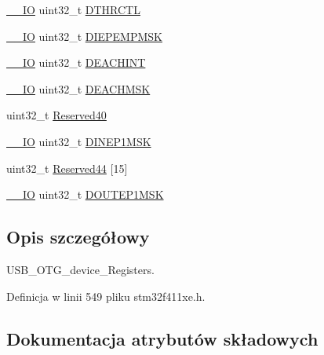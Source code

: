 \begin{DoxyCompactItemize}
\item 
\hyperlink{core__sc300_8h_aec43007d9998a0a0e01faede4133d6be}{\+\_\+\+\_\+\+IO} uint32\+\_\+t \hyperlink{struct_u_s_b___o_t_g___device_type_def_af0a7a07413a095432031eddc900031cd}{D\+T\+H\+R\+C\+TL}
\item 
\hyperlink{core__sc300_8h_aec43007d9998a0a0e01faede4133d6be}{\+\_\+\+\_\+\+IO} uint32\+\_\+t \hyperlink{struct_u_s_b___o_t_g___device_type_def_a6dca86482073d69a44c8e0e3a5efe068}{D\+I\+E\+P\+E\+M\+P\+M\+SK}
\item 
\hyperlink{core__sc300_8h_aec43007d9998a0a0e01faede4133d6be}{\+\_\+\+\_\+\+IO} uint32\+\_\+t \hyperlink{struct_u_s_b___o_t_g___device_type_def_a881208a5819f6a8bfb1f16a2d7cd05a1}{D\+E\+A\+C\+H\+I\+NT}
\item 
\hyperlink{core__sc300_8h_aec43007d9998a0a0e01faede4133d6be}{\+\_\+\+\_\+\+IO} uint32\+\_\+t \hyperlink{struct_u_s_b___o_t_g___device_type_def_ab10e5be5517065dccac3d098cc1b9894}{D\+E\+A\+C\+H\+M\+SK}
\item 
uint32\+\_\+t \hyperlink{struct_u_s_b___o_t_g___device_type_def_a4356045c881b1f037c3016473e580679}{Reserved40}
\item 
\hyperlink{core__sc300_8h_aec43007d9998a0a0e01faede4133d6be}{\+\_\+\+\_\+\+IO} uint32\+\_\+t \hyperlink{struct_u_s_b___o_t_g___device_type_def_a6dccbd3d18fe0e4e552aefc9f6f469fa}{D\+I\+N\+E\+P1\+M\+SK}
\item 
uint32\+\_\+t \hyperlink{struct_u_s_b___o_t_g___device_type_def_a6bb6a88a8d92f9cb65d104f40934844b}{Reserved44} \mbox{[}15\mbox{]}
\item 
\hyperlink{core__sc300_8h_aec43007d9998a0a0e01faede4133d6be}{\+\_\+\+\_\+\+IO} uint32\+\_\+t \hyperlink{struct_u_s_b___o_t_g___device_type_def_aabe0c08efd8c18aa1f85e4a38a3d2469}{D\+O\+U\+T\+E\+P1\+M\+SK}
\end{DoxyCompactItemize}


\subsection{Opis szczegółowy}
U\+S\+B\+\_\+\+O\+T\+G\+\_\+device\+\_\+\+Registers. 

Definicja w linii 549 pliku stm32f411xe.\+h.



\subsection{Dokumentacja atrybutów składowych}
\mbox{\label{struct_u_s_b___o_t_g___device_type_def_a5d28aaa3ea2e4e2246f9ba7025c6a8e7}} 
